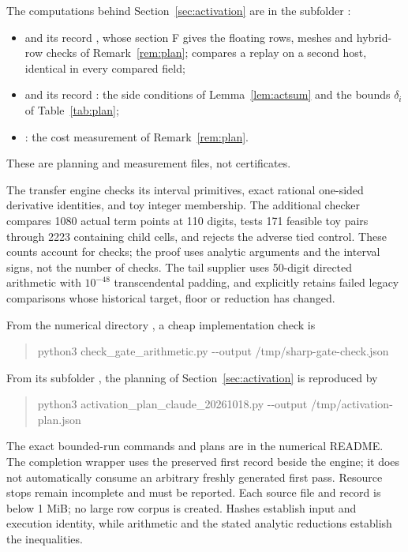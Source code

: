 \documentclass[11pt]{article}
\theoremstyle{remark}
\numberwithin{equation}{section}
\begin{document}
The computations behind Section~\ref{sec:activation} are in the
subfolder :
\begin{itemize}
\item {} and its record
 , whose section F gives the
 floating rows, meshes and hybrid-row checks of Remark~\ref{rem:plan};
  compares a replay on a
 second host, identical in every compared field;
\item {} and its record
 : the side conditions of
 Lemma~\ref{lem:actsum} and the bounds $\delta_i$ of Table~\ref{tab:plan};
\item {}: the cost
 measurement of Remark~\ref{rem:plan}.
\end{itemize}
These are planning and measurement files, not certificates.

The transfer engine checks its interval primitives, exact rational
one-sided derivative identities, and toy integer membership. The
additional checker compares 1080 actual term points at 110 digits,
tests 171 feasible toy pairs through 2223 containing child cells, and
rejects the adverse tied control. These counts account for checks; the
proof uses analytic arguments and the interval signs, not the number of
checks. The tail supplier uses 50-digit directed arithmetic with
$10^{-48}$ transcendental padding, and explicitly retains failed legacy
comparisons whose historical target, floor or reduction has changed.

From the numerical directory
,
a cheap implementation check is
\begin{quote}\small\ttfamily
python3 check\_gate\_arithmetic.py -{}-output /tmp/sharp-gate-check.json
\end{quote}
From its subfolder , the planning of
Section~\ref{sec:activation} is reproduced by
\begin{quote}\small\ttfamily
python3 activation\_plan\_claude\_20261018.py -{}-output /tmp/activation-plan.json
\end{quote}
The exact bounded-run commands and plans are in the numerical README.
The completion wrapper uses the preserved first record beside the
engine; it does not automatically consume an arbitrary freshly generated
first pass. Resource stops remain incomplete and must be reported.
Each source file and record is below 1 MiB; no large row corpus is
created. Hashes establish input and execution identity, while arithmetic
and the stated analytic reductions establish the inequalities.
\end{document}
